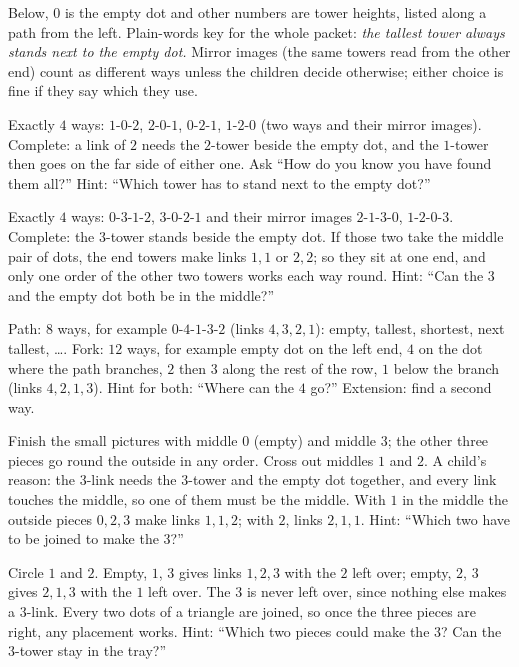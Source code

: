 Below, $0$ is the empty dot and other numbers are tower heights, listed along a path from the left. Plain-words key for the whole packet: \emph{the tallest tower always stands next to the empty dot.} Mirror images (the same towers read from the other end) count as different ways unless the children decide otherwise; either choice is fine if they say which they use.

Exactly $4$ ways: $1$-$0$-$2$, $2$-$0$-$1$, $0$-$2$-$1$, $1$-$2$-$0$ (two ways and their mirror images). Complete: a link of $2$ needs the $2$-tower beside the empty dot, and the $1$-tower then goes on the far side of either one. Ask ``How do you know you have found them all?'' Hint: ``Which tower has to stand next to the empty dot?''

Exactly $4$ ways: $0$-$3$-$1$-$2$, $3$-$0$-$2$-$1$ and their mirror images $2$-$1$-$3$-$0$, $1$-$2$-$0$-$3$. Complete: the $3$-tower stands beside the empty dot. If those two take the middle pair of dots, the end towers make links $1,1$ or $2,2$; so they sit at one end, and only one order of the other two towers works each way round. Hint: ``Can the $3$ and the empty dot both be in the middle?''

Path: $8$ ways, for example $0$-$4$-$1$-$3$-$2$ (links $4,3,2,1$): empty, tallest, shortest, next tallest, \dots. Fork: $12$ ways, for example empty dot on the left end, $4$ on the dot where the path branches, $2$ then $3$ along the rest of the row, $1$ below the branch (links $4,2,1,3$). Hint for both: ``Where can the $4$ go?'' Extension: find a second way.

Finish the small pictures with middle $0$ (empty) and middle $3$; the other three pieces go round the outside in any order. Cross out middles $1$ and $2$. A child's reason: the $3$-link needs the $3$-tower and the empty dot together, and every link touches the middle, so one of them must be the middle. With $1$ in the middle the outside pieces $0,2,3$ make links $1,1,2$; with $2$, links $2,1,1$. Hint: ``Which two have to be joined to make the $3$?''

Circle $1$ and $2$. Empty, $1$, $3$ gives links $1,2,3$ with the $2$ left over; empty, $2$, $3$ gives $2,1,3$ with the $1$ left over. The $3$ is never left over, since nothing else makes a $3$-link. Every two dots of a triangle are joined, so once the three pieces are right, any placement works. Hint: ``Which two pieces could make the $3$? Can the $3$-tower stay in the tray?''

